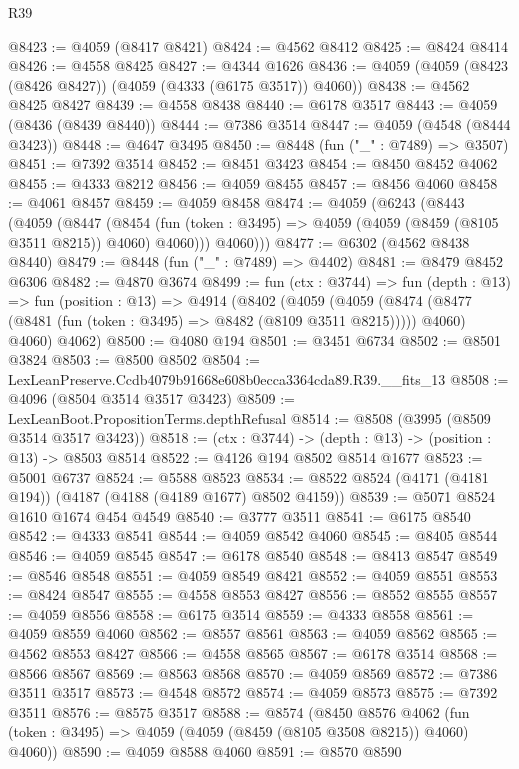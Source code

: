 \begin{lexlean}{R39}
\begin{coremodule}
@8423 := @4059 (@8417 @8421)
@8424 := @4562 @8412
@8425 := @8424 @8414
@8426 := @4558 @8425
@8427 := @4344 @1626
@8436 := @4059 (@4059 (@8423 (@8426 @8427)) (@4059 (@4333 (@6175 @3517)) @4060))
@8438 := @4562 @8425 @8427
@8439 := @4558 @8438
@8440 := @6178 @3517
@8443 := @4059 (@8436 (@8439 @8440))
@8444 := @7386 @3514
@8447 := @4059 (@4548 (@8444 @3423))
@8448 := @4647 @3495
@8450 := @8448 (fun ("_" : @7489) => @3507)
@8451 := @7392 @3514
@8452 := @8451 @3423
@8454 := @8450 @8452 @4062
@8455 := @4333 @8212
@8456 := @4059 @8455
@8457 := @8456 @4060
@8458 := @4061 @8457
@8459 := @4059 @8458
@8474 := @4059
    (@6243
      (@8443
        (@4059
          (@8447
            (@8454 (fun (token : @3495) => @4059 (@4059 (@8459 (@8105 @3511 @8215)) @4060) @4060)))
          @4060)))
@8477 := @6302 (@4562 @8438 @8440)
@8479 := @8448 (fun ("_" : @7489) => @4402)
@8481 := @8479 @8452 @6306
@8482 := @4870 @3674
@8499 := fun (ctx : @3744) =>
  fun (depth : @13) =>
  fun (position : @13) =>
  @4914
    (@8402
      (@4059
        (@4059 (@8474 (@8477 (@8481 (fun (token : @3495) => @8482 (@8109 @3511 @8215))))) @4060)
        @4060)
      @4062)
@8500 := @4080 @194
@8501 := @3451 @6734
@8502 := @8501 @3824
@8503 := @8500 @8502
@8504 := LexLeanPreserve.Ccdb4079b91668e608b0ecca3364cda89.R39.__fits_13
@8508 := @4096 (@8504 @3514 @3517 @3423)
@8509 := LexLeanBoot.PropositionTerms.depthRefusal
@8514 := @8508 (@3995 (@8509 @3514 @3517 @3423))
@8518 := (ctx : @3744) -> (depth : @13) -> (position : @13) -> @8503 @8514
@8522 := @4126 @194 @8502 @8514 @1677
@8523 := @5001 @6737
@8524 := @5588 @8523
@8534 := @8522 @8524 (@4171 (@4181 @194)) (@4187 (@4188 (@4189 @1677) @8502 @4159))
@8539 := @5071 @8524 @1610 @1674 @454 @4549
@8540 := @3777 @3511
@8541 := @6175 @8540
@8542 := @4333 @8541
@8544 := @4059 @8542 @4060
@8545 := @8405 @8544
@8546 := @4059 @8545
@8547 := @6178 @8540
@8548 := @8413 @8547
@8549 := @8546 @8548
@8551 := @4059 @8549 @8421
@8552 := @4059 @8551
@8553 := @8424 @8547
@8555 := @4558 @8553 @8427
@8556 := @8552 @8555
@8557 := @4059 @8556
@8558 := @6175 @3514
@8559 := @4333 @8558
@8561 := @4059 @8559 @4060
@8562 := @8557 @8561
@8563 := @4059 @8562
@8565 := @4562 @8553 @8427
@8566 := @4558 @8565
@8567 := @6178 @3514
@8568 := @8566 @8567
@8569 := @8563 @8568
@8570 := @4059 @8569
@8572 := @7386 @3511 @3517
@8573 := @4548 @8572
@8574 := @4059 @8573
@8575 := @7392 @3511
@8576 := @8575 @3517
@8588 := @8574
    (@8450
      @8576
      @4062
      (fun (token : @3495) => @4059 (@4059 (@8459 (@8105 @3508 @8215)) @4060) @4060))
@8590 := @4059 @8588 @4060
@8591 := @8570 @8590

\end{coremodule}
\end{lexlean}
